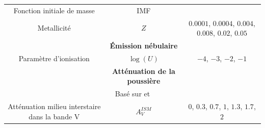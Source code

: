 \documentclass[../main/main.tex]{subfiles}
\begin{document}
\begin{table}[h]
{\begin{tabularx}{1.2\textwidth}{ccc}
                               
                               \hline
                               Fonction initiale de masse & IMF & \citet{Chabrier2003}\\
                               
          Metallicité & $Z$ & $0.0001$, $0.0004$, $0.004$, $0.008$,
                              $0.02$, $0.05$\\
                               
                               \hline                               

                                                   & \textbf{\'Emission
                                                     nébulaire} & \\
                               \hline
                               
                               Paramètre d'ionisation& $\log(U)$& $-4$, $-3$, $-2$, $-1$\\
                               
                               \hline
                                                   & \textbf{Atténuation
                                                     de la
                                                     poussière}&\\
                               \multicolumn{3}{c}{Basé sur
                               \citep{CharlotFall2000} et \citet{Buat2018}}\hspace{-1.1cm}\\
                               \hline
                               Atténuation milieu interstaire dans la
                               bande V & $A_{V}^{ISM}$&$0$, $0.3$,
                                                        $0.7$, $1$,
                                                        $1.3$, $1.7$,
                                                        $2$\\
                              

\end{tabularx}}
\end{table}
\end{document}

